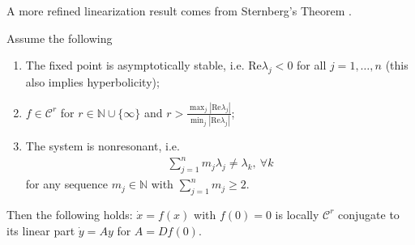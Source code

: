A more refined linearization result comes from Sternberg's Theorem \cite{Chicone}.
\begin{theorem}[Sternberg]
Assume the following
\begin{enumerate}
	\item The fixed point is asymptotically stable, i.e. $ \textrm{Re} \lambda _j<0$ for all $j=1,\ldots,n$ (this also implies hyperbolicity);
	\item $f\in \mathcal{C}^{r}$ for $r\in \mathbb{N}\cup \{\infty \}$ and $r>\frac{\max_{j}| \textrm{Re} \lambda _j|}{\min_{j}| \textrm{Re} \lambda _j|}$;
	\item The system is nonresonant, i.e. 
		\begin{align}
			\sum_{j=1}^{n}m_j \lambda _j \neq \lambda_k,\ \forall k
		\end{align}
	for any sequence $m_j \in \mathbb{N}$ with $\sum_{j=1}^{n} m_j \geq 2$.
	
\end{enumerate}
Then the following holds: $\dot{x}=f(x)$ with $f(0)=0$ is locally $\mathcal{C}^{r}$ conjugate to its linear part $\dot{y}=Ay$ for $A= Df(0)$.
\end{theorem}



